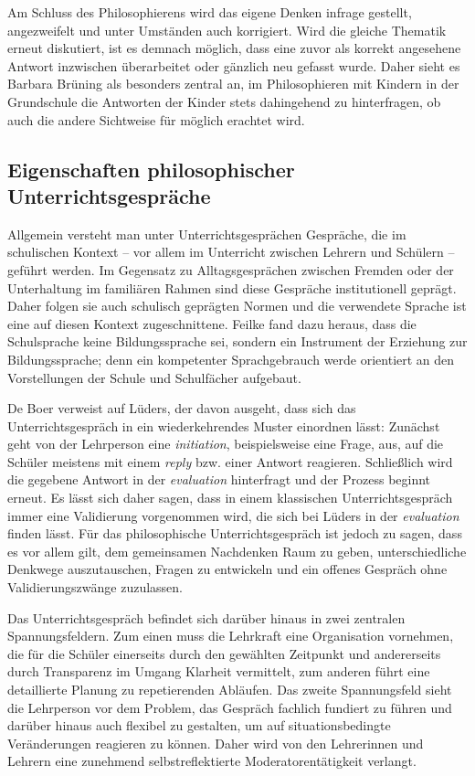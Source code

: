 Am Schluss des Philosophierens wird das eigene Denken infrage gestellt, angezweifelt und unter Umständen auch korrigiert. 
Wird die gleiche Thematik erneut diskutiert, ist es demnach möglich, dass eine zuvor als korrekt angesehene Antwort inzwischen überarbeitet oder gänzlich neu gefasst wurde. 
Daher sieht es Barbara Brüning als besonders zentral an, im Philosophieren mit Kindern in der Grundschule die Antworten der Kinder stets dahingehend zu hinterfragen, ob auch die andere Sichtweise für möglich erachtet wird.


\newpage
\subsection{Eigenschaften philosophischer Unterrichtsgespräche}

Allgemein versteht man unter Unterrichtsgesprächen Gespräche, die im schulischen Kontext -- vor allem im Unterricht zwischen Lehrern und Schülern -- geführt werden. 
Im Gegensatz zu Alltagsgesprächen zwischen Fremden oder der Unterhaltung im familiären Rahmen sind diese Gespräche \glqq institutionell geprägt\grqq{}\cite[S.\,28]{HB15}. 
Daher folgen sie auch schulisch geprägten Normen und die verwendete Sprache ist eine auf diesen Kontext zugeschnittene. 
Feilke fand dazu heraus, dass \glqq die Schulsprache keine Bildungssprache sei, sondern ein Instrument der Erziehung zur Bildungssprache; denn ein kompetenter Sprachgebrauch werde orientiert an den Vorstellungen der Schule und Schulfächer aufgebaut.\grqq{}\cite[S.\,117]{HF13}

De Boer verweist auf Lüders, der davon ausgeht, dass sich das Unterrichtsgespräch in ein wiederkehrendes Muster einordnen lässt\cite[S.\,28]{HB15}:
 Zunächst geht von der Lehrperson eine \textit{initiation}, beispielsweise eine Frage, aus, auf die Schüler meistens mit einem \textit{reply} bzw. einer Antwort reagieren. 
 Schließlich wird die gegebene Antwort in der \textit{evaluation} hinterfragt und der Prozess beginnt erneut. 
 Es lässt sich daher sagen, dass in einem klassischen Unterrichtsgespräch immer eine Validierung vorgenommen wird, die sich bei Lüders in der \textit{evaluation} finden lässt. 
 Für das philosophische Unterrichtsgespräch ist jedoch zu sagen, dass es vor allem gilt, \glqq dem gemeinsamen Nachdenken Raum zu geben, unterschiedliche Denkwege auszutauschen, Fragen zu entwickeln und ein offenes Gespräch ohne Validierungszwänge zuzulassen\grqq{}\cite[S.\,159]{HD15}.
 
Das Unterrichtsgespräch befindet sich darüber hinaus in zwei zentralen Spannungsfeldern. 
Zum einen muss die Lehrkraft eine Organisation vornehmen, die für die Schüler einerseits durch den gewählten Zeitpunkt und andererseits durch Transparenz im Umgang Klarheit vermittelt, zum anderen führt eine detaillierte Planung zu repetierenden Abläufen\cite[S.\,31]{HB15}. 
Das zweite Spannungsfeld sieht die Lehrperson vor dem Problem, das Gespräch fachlich fundiert zu führen und darüber hinaus auch flexibel zu gestalten, um auf situationsbedingte Veränderungen reagieren zu können. 
Daher wird von den Lehrerinnen und Lehrern eine zunehmend selbstreflektierte Moderatorentätigkeit verlangt.

